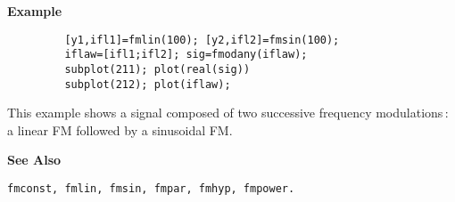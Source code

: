 {\bf \large \sf Example}\\
\hspace*{1.5cm}
\begin{minipage}[t]{13.5cm}
\begin{verbatim}
         [y1,ifl1]=fmlin(100); [y2,ifl2]=fmsin(100);
         iflaw=[ifl1;ifl2]; sig=fmodany(iflaw); 
         subplot(211); plot(real(sig))
         subplot(212); plot(iflaw); 
\end{verbatim}
This example shows a signal composed of two successive frequency
modulations\,: a linear FM followed by a sinusoidal FM.\\
\end{minipage}
\vspace*{.5cm}


{\bf \large \sf See Also}\\
\hspace*{1.5cm}
\begin{minipage}[t]{13.5cm}
\begin{verbatim}
fmconst, fmlin, fmsin, fmpar, fmhyp, fmpower.
\end{verbatim}
\end{minipage}




